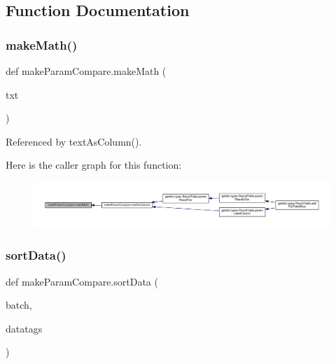 \subsection{Function Documentation}
\mbox{\label{namespacemakeParamCompare_a0ba50ebae7e2f64b2c0b7c2565ce9164}} 
\subsubsection{\texorpdfstring{make\+Math()}{makeMath()}}
{\footnotesize\ttfamily def make\+Param\+Compare.\+make\+Math (\begin{DoxyParamCaption}\item[{}]{txt }\end{DoxyParamCaption})}



Referenced by text\+As\+Column().

Here is the caller graph for this function\+:
\nopagebreak
\begin{figure}[H]
\begin{center}
\leavevmode
\includegraphics[width=350pt]{namespacemakeParamCompare_a0ba50ebae7e2f64b2c0b7c2565ce9164_icgraph}
\end{center}
\end{figure}
\mbox{\label{namespacemakeParamCompare_a95ae87ac4d7bb7ad63308082592f2677}} 
\subsubsection{\texorpdfstring{sort\+Data()}{sortData()}}
{\footnotesize\ttfamily def make\+Param\+Compare.\+sort\+Data (\begin{DoxyParamCaption}\item[{}]{batch,  }\item[{}]{datatags }\end{DoxyParamCaption})}

